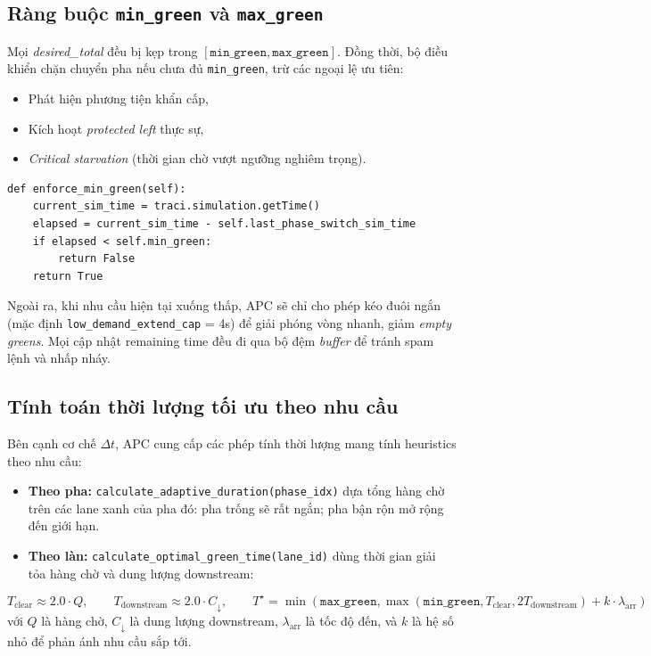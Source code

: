 \documentclass[12pt,a4paper,oneside]{report}
\begin{document}
\subsection{Ràng buộc \texttt{min\_green} và \texttt{max\_green}}

Mọi \emph{desired\_total} đều bị kẹp trong \([\texttt{min\_green}, \texttt{max\_green}]\). Đồng thời, bộ điều khiển chặn chuyển pha nếu chưa đủ \texttt{min\_green}, trừ các ngoại lệ ưu tiên:
\begin{itemize}
    \item Phát hiện phương tiện khẩn cấp,
    \item Kích hoạt \emph{protected left} thực sự,
    \item \emph{Critical starvation} (thời gian chờ vượt ngưỡng nghiêm trọng).
\end{itemize}

\begin{lstlisting}[style=py, caption={Enforce thời gian xanh tối thiểu với ngoại lệ}, label={lst:min_green}]
def enforce_min_green(self):
    current_sim_time = traci.simulation.getTime()
    elapsed = current_sim_time - self.last_phase_switch_sim_time
    if elapsed < self.min_green:
        return False
    return True
\end{lstlisting}

Ngoài ra, khi nhu cầu hiện tại xuống thấp, APC sẽ chỉ cho phép kéo đuôi ngắn (mặc định \texttt{low\_demand\_extend\_cap} = 4s) để giải phóng vòng nhanh, giảm \emph{empty greens}. Mọi cập nhật remaining time đều đi qua bộ đệm \emph{buffer} để tránh spam lệnh và nhấp nháy.

\subsection{Tính toán thời lượng tối ưu theo nhu cầu}

Bên cạnh cơ chế \(\Delta t\), APC cung cấp các phép tính thời lượng mang tính heuristics theo nhu cầu:
\begin{itemize}
    \item \textbf{Theo pha:} \texttt{calculate\_adaptive\_duration(phase\_idx)} dựa tổng hàng chờ trên các lane xanh của pha đó: pha trống sẽ rất ngắn; pha bận rộn mở rộng đến giới hạn.
    \item \textbf{Theo làn:} \texttt{calculate\_optimal\_green\_time(lane\_id)} dùng thời gian giải tỏa hàng chờ và dung lượng downstream:
\end{itemize}

\[
T_{\text{clear}} \approx 2.0 \cdot Q, \qquad
T_{\text{downstream}} \approx 2.0 \cdot C_{\downarrow}, \qquad
T^{\star} = \min\left(\texttt{max\_green}, \max\left(\texttt{min\_green}, T_{\text{clear}}, 2T_{\text{downstream}}\right) + k \cdot \lambda_{\text{arr}}\right)
\]
với \(Q\) là hàng chờ, \(C_{\downarrow}\) là dung lượng downstream, \(\lambda_{\text{arr}}\) là tốc độ đến, và \(k\) là hệ số nhỏ để phản ánh nhu cầu sắp tới.
\end{document}
